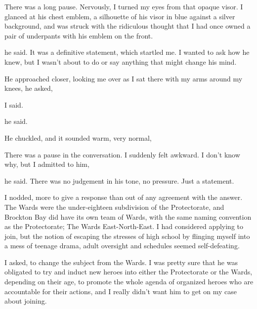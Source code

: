 There was a long pause. Nervously, I turned my eyes from that opaque visor. I glanced at his chest emblem, a silhouette of his visor in blue against a silver background, and was struck with the ridiculous thought that I had once owned a pair of underpants with his emblem on the front.

 he said. It was a definitive statement, which startled me. I wanted to ask how he knew, but I wasn't about to do or say anything that might change his mind.

He approached closer, looking me over as I sat there with my arms around my knees, he asked, 

 I said. 

 he said.


He chuckled, and it sounded warm, very normal, 

There was a pause in the conversation. I suddenly felt awkward. I don't know why, but I admitted to him, 

 he said. There was no judgement in his tone, no pressure. Just a statement.

I nodded, more to give a response than out of any agreement with the answer. The Wards were the under-eighteen subdivision of the Protectorate, and Brockton Bay did have its own team of Wards, with the same naming convention as the Protectorate; The Wards East-North-East. I had considered applying to join, but the notion of escaping the stresses of high school by flinging myself into a mess of teenage drama, adult oversight and schedules seemed self-defeating.

 I asked, to change the subject from the Wards. I was pretty sure that he was obligated to try and induct new heroes into either the Protectorate or the Wards, depending on their age, to promote the whole agenda of organized heroes who are accountable for their actions, and I really didn't want him to get on my case about joining.

